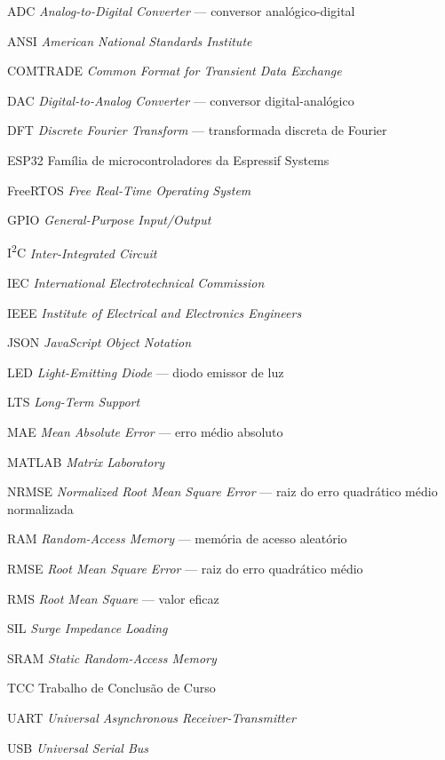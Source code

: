 \documentclass[
  12pt,
  oneside,
  a4paper,
  brazil,
  sumario=tradicional
]{abntex2}
\begin{document}
\cleardoublepage
{}
\pagestyle{pretextualnumerado}

\listoffigures*
\thispagestyle{pretextualnumerado}
\cleardoublepage

\listoftables*
\thispagestyle{pretextualnumerado}
\cleardoublepage

\renewcommand{\listadesiglasname}{Lista de Siglas}
\begin{siglas}
  \thispagestyle{pretextualnumerado}
  \item[ADC] \textit{Analog-to-Digital Converter} --- conversor analógico-digital
  \item[ANSI] \textit{American National Standards Institute}
  \item[COMTRADE] \textit{Common Format for Transient Data Exchange}
  \item[DAC] \textit{Digital-to-Analog Converter} --- conversor digital-analógico
  \item[DFT] \textit{Discrete Fourier Transform} --- transformada discreta de Fourier
  \item[ESP32] Família de microcontroladores da Espressif Systems
  \item[FreeRTOS] \textit{Free Real-Time Operating System}
  \item[GPIO] \textit{General-Purpose Input/Output}
  \item[I\textsuperscript{2}C] \textit{Inter-Integrated Circuit}
  \item[IEC] \textit{International Electrotechnical Commission}
  \item[IEEE] \textit{Institute of Electrical and Electronics Engineers}
  \item[JSON] \textit{JavaScript Object Notation}
  \item[LED] \textit{Light-Emitting Diode} --- diodo emissor de luz
  \item[LTS] \textit{Long-Term Support}
  \item[MAE] \textit{Mean Absolute Error} --- erro médio absoluto
  \item[MATLAB] \textit{Matrix Laboratory}
  \item[NRMSE] \textit{Normalized Root Mean Square Error} --- raiz do erro quadrático médio normalizada
  \item[RAM] \textit{Random-Access Memory} --- memória de acesso aleatório
  \item[RMSE] \textit{Root Mean Square Error} --- raiz do erro quadrático médio
  \item[RMS] \textit{Root Mean Square} --- valor eficaz
  \item[SIL] \textit{Surge Impedance Loading}
  \item[SRAM] \textit{Static Random-Access Memory}
  \item[TCC] Trabalho de Conclusão de Curso
  \item[UART] \textit{Universal Asynchronous Receiver-Transmitter}
  \item[USB] \textit{Universal Serial Bus}
\end{siglas}
\thispagestyle{pretextualnumerado}
\cleardoublepage
\end{document}
